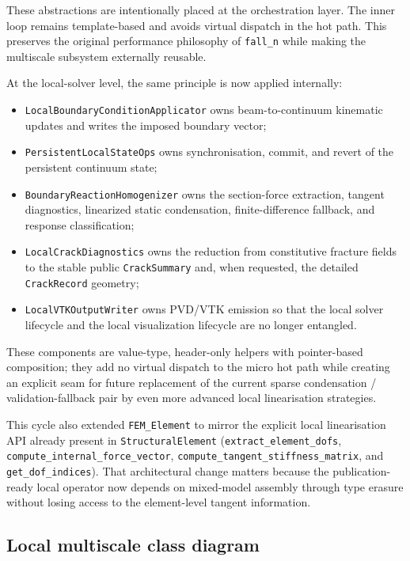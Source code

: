 These abstractions are intentionally placed at the orchestration layer.  The
inner loop remains template-based and avoids virtual dispatch in the hot path.
This preserves the original performance philosophy of \texttt{fall\_n} while
making the multiscale subsystem externally reusable.

At the local-solver level, the same principle is now applied internally:
\begin{itemize}
  \item \texttt{LocalBoundaryConditionApplicator} owns beam-to-continuum
    kinematic updates and writes the imposed boundary vector;
  \item \texttt{PersistentLocalStateOps} owns synchronisation,
    commit, and revert of the persistent continuum state;
  \item \texttt{BoundaryReactionHomogenizer} owns the section-force extraction,
    tangent diagnostics, linearized static condensation, finite-difference
    fallback, and response classification;
  \item \texttt{LocalCrackDiagnostics} owns the reduction from constitutive
    fracture fields to the stable public \texttt{CrackSummary} and, when
    requested, the detailed \texttt{CrackRecord} geometry;
  \item \texttt{LocalVTKOutputWriter} owns PVD/VTK emission so that the local
    solver lifecycle and the local visualization lifecycle are no longer
    entangled.
\end{itemize}
These components are value-type, header-only helpers with pointer-based
composition; they add no virtual dispatch to the micro hot path while creating
an explicit seam for future replacement of the current sparse condensation /
validation-fallback pair by even more advanced local linearisation
strategies.

This cycle also extended \texttt{FEM\_Element} to mirror the explicit local
linearisation API already present in \texttt{StructuralElement}
(\texttt{extract\_element\_dofs}, \texttt{compute\_internal\_force\_vector},
\texttt{compute\_tangent\_stiffness\_matrix}, and
\texttt{get\_dof\_indices}).  That architectural change matters because the
publication-ready local operator now depends on mixed-model assembly through
type erasure without losing access to the element-level tangent information.

\subsection{Local multiscale class diagram}

